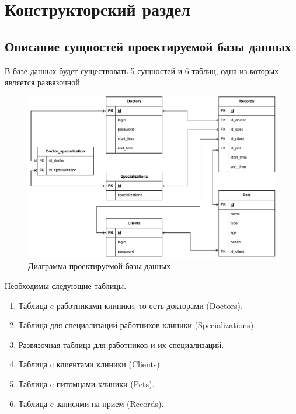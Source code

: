 \section{Конструкторский раздел}

\subsection{Описание сущностей проектируемой базы данных}

В базе данных будет существовать 5 сущностей и 6 таблиц, одна из которых является развязочной. 
\begin{figure}[hbtp]
	\centering
	\includegraphics[width=170mm]{image/bd.pdf}
	\caption{Диаграмма проектируемой базы данных}
	\label{img:idef}
\end{figure}

Необходимы следующие таблицы.
\begin{enumerate}[label=\arabic*)]
	\item Таблица c работниками клиники, то есть докторами (Doctors).
	\item Таблица для специализаций работников клиники (Specializations).
	\item Развязочная таблица для работников и их специализаций.
	\item Таблица c клиентами клиники (Clients).
	\item Таблица c питомцами клиники (Pets).
	\item Таблица c записями на прием (Records).
\end{enumerate}

